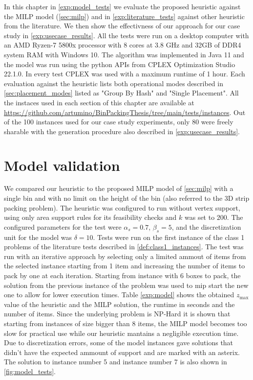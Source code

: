 In this chapter in \cref{exp:model_tests} we evaluate the proposed heuristic against the MILP model (\ref{sec:milp}) and in \cref{exp:literature_tests} against other heuristic from the literature. We then show the effectivness of our approach for our case study in \cref{exp:usecase_results}.
All the tests were run on a desktop computer with an AMD Ryzen-7 5800x processor with 8 cores at 3.8 GHz and 32GB of DDR4 system RAM with Windows 10. The algorithm was implemented in Java 11 and the model was run using the python APIs from CPLEX Optimization Studio 22.1.0.
In every test CPLEX was used with a maximum runtime of 1 hour.
Each evaluation against the heuristic lists both operational modes described in \cref{sec:placement_modes} listed as "Group By Hash" and "Single Placement".
All the instaces used in each section of this chapter are available at \url{https://github.com/artumino/BinPackingThesis/tree/main/tests/instances}.
Out of the 100 instances used for our case study experiments, only 80 were freely sharable with the generation procedure also described in \cref{exp:usecase_results}.

\section{Model validation}
We compared our heuristic to the proposed MILP model of \cref{sec:milp} with a single bin and with no limit on the height of the bin (also referred to the 3D strip packing problem).
The heuristic was configured to run without vertex support, using only area support rules for its feasibility checks and $k$ was set to $200$.
The configured parameters for the test were $\alpha_s = 0.7$, $\beta_s = 5$, and the discretization unit for the model was $\delta = 10$. 
Tests were run on the first instance of the class 1 problems of the literature tests described in \cref{def:class1_instances}.
The test was run with an iterative approach by selecting only a limited ammout of items from the selected instance starting from 1 item and increasing the number of items to pack by one at each iteration.
Starting from instance with 6 boxes to pack, the solution from the previous instance of the problem was used to mip start the new one to allow for lower execution times.
Table \ref{exp:model} shows the obtained $z_{\text{max}}$ value of the heuristic and the MILP solution, the runtime in seconds and the number of items.
Since the underlying problem is NP-Hard it is shown that starting from instances of size bigger than 8 items, the MILP model becomes too slow for practical use while our heuristic mantains a negligible execution time.
Due to discretization errors, some of the model instances gave solutions that didn't have the expected ammount of support and are marked with an asterix.
The solution to instance number 5 and instance number 7 is also shown in \cref{fig:model_tests}.
\label{exp:model_tests}



